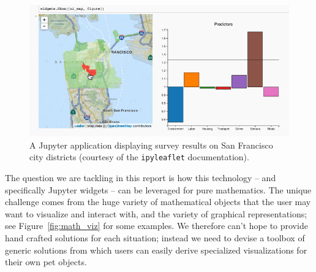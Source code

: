 \documentclass{deliverablereport}
\begin{document}
\begin{figure}[h]
  \begin{center}
    \includegraphics[width=\textwidth]{images/sc-ipyleaflet}
    \caption{A Jupyter application displaying survey results on San
      Francisco city districts \tiny{(courtesy of the \lstinline{ipyleaflet} documentation)}.}
  \label{fig:ipyleaflet}
  \end{center}
\end{figure}

The question we are tackling in this report is how this technology --
and specifically Jupyter widgets -- can be leveraged for pure
mathematics. The unique challenge comes from the huge variety of
mathematical objects that the user may want to visualize and
interact with, and the variety of graphical representations;
see Figure~\ref{fig:math_viz} for some examples.
%
We therefore can't hope to provide hand crafted solutions for each
situation; instead we need to devise a toolbox of generic solutions
from which users can easily derive specialized visualizations for
their own pet objects.

\end{document}
